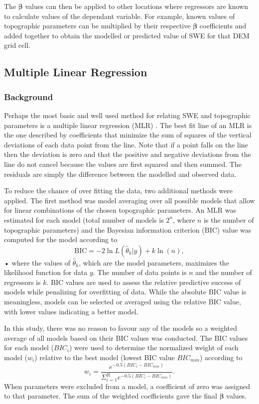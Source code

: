 \documentclass[12pt]{article}
\begin{document}
The $\bm{\beta}$ values can then be applied to other locations where regressors are known to calculate values of the dependant variable. For example, known values of topographic parameters can be multiplied by their respective $\bm{\beta}$ coefficients and added together to obtain the modelled or predicted value of SWE for that DEM grid cell.


\subsection{Multiple Linear Regression}
\label{sec:MLR}

\subsubsection{Background}

Perhaps the most basic and well used method for relating SWE and topographic parameters is a multiple linear regression (MLR) \citep[e.g.][]{Cohen2013}. The best fit line of an MLR is the one described by coefficients that minimize the sum of squares of the vertical deviations of each data point from the line. Note that if a point falls on the line then the deviation is zero and that the positive and negative deviations from the line do not cancel because the values are first squared and then summed. The residuals are simply the difference between the modelled and observed data. 

To reduce the chance of over fitting the data, two additional methods were applied. The first method was model averaging over all possible models that allow for linear combinations of the chosen topographic parameters. An MLR was estimated for each model (total number of models is $2^n$, where $n$ is the number of topographic parameters) and the Bayesian information criterion (BIC) value was computed for the model according to
\begin{equation}
\textrm{BIC} = -2 \ln L(\hat\theta_k  | y) + k \ln(n),
\end{equation}•
where the values of $\hat \theta_k$, which are the model parameters, maximizes the likelihood function for data $y$. The number of data points is $n$ and the number of regressors is $k$. BIC values are used to assess the relative predictive success of models while penalizing for overfitting of data. While the absolute BIC value is meaningless, models can be selected or averaged using the relative BIC value, with lower values indicating a better model. 

In this study, there was no reason to favour any of the models so a weighted average of all models based on their BIC values was conducted. The BIC values for each model ($BIC_i$) were used to determine the normalized weight of each model ($w_i$) relative to the best model (lowest BIC value $BIC_{min}$) according to \citep{Burnham2004}
\begin{equation}
w_i = \frac{e^{-0.5(BIC_i-BIC_{min})}}{\Sigma_{i=1}^R e^{-0.5(BIC_i-BIC_{min})}}.
\label{eq:BIC}
\end{equation}
When parameters were excluded from a model, a coefficient of zero was assigned to that parameter. The sum of the weighted coefficients gave the final $\bm{\beta}$ values.
\end{document}
